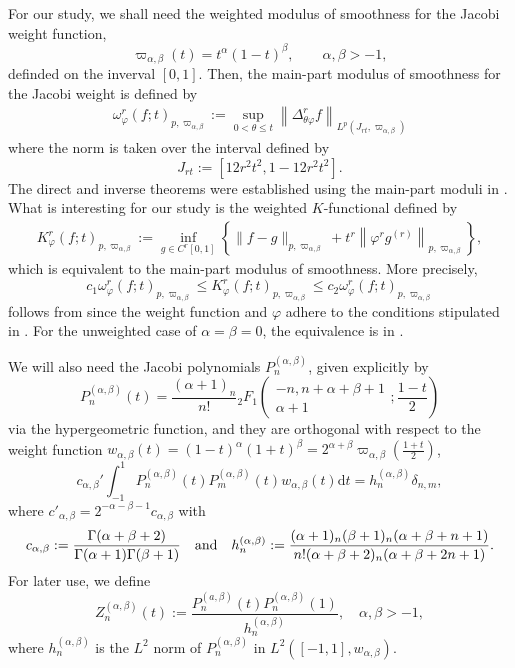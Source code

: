 \documentclass{amsart}
\theoremstyle{remark}
\def\d{\mathrm{d}}
\def\a{{\alpha}}
\def\b{{\beta}}
\def\t{{\theta}}
\def\o{{\omega}}
\def\d{\mathrm{d}}
\def\sK{{\mathsf K}}
\def\a{{\alpha}}
\def\b{{\beta}}
\def\t{{\theta}}
\def\o{{\omega}}
\begin{document}
For our study, we shall need the weighted  modulus of smoothness for the Jacobi weight function, 
$$
    \varpi_{\a,\b}(t) = t^\a (1-t)^\b, \qquad \a, \b > -1,
$$
definded on the inverval $[0,1]$. 
Then, the main-part  modulus of smoothness for the Jacobi weight is defined by \cite[(8.1.2)]{DT}
\begin{align} \label{eq:o_phi}
\o^r_\varphi (f; t)_{p,\varpi_{\a,\b}} := \sup_{0<\t \le t} \left\| \Delta_{\t\varphi}^r f\right\|_{L^p(J_{r t},\varpi_{\a,\b}) } 
\end{align} 
where the  norm is  taken over the interval defined by 
$$
J_ {r t}:=[12 r^2 t^2, 1- 12 r^2 t^2].
$$
The direct and inverse theorems were established using the main-part moduli in 
\cite[Theorem 8.2.1]{DT}. What is interesting for our study is the weighted $K$-functional defined by
\begin{align} \label{eq:K_phi}
   K^r_\varphi (f; t)_{p,\varpi_{\a,\b}} := \inf_{g \in C^r[0,1]}
  	\left \{ \|f-g\|_{p,\varpi_{\a,\b}} + t^r \left\|\varphi^r g^{(r)} \right\|_{p,\varpi_{\a,\b}} \right \},
\end{align}
which is equivalent to the main-part modulus of smoothness. More precisely, 
\begin{equation} \label{eq:K-o[0,1]}
   c_1 \o^r_\varphi (f; t)_{p,\varpi_{\a,\b}} \le K^r_\varphi (f; t)_{p,\varpi_{\a,\b}} \le c_2 \o^r_\varphi (f; t)_{p,\varpi_{\a,\b}}
\end{equation}
follows from \cite[Theorem 6.1.1]{DT} since the weight function and \(\varphi\) adhere to the conditions stipulated 
in \cite[(6.1.2) and Section 1.2]{DT}. For the unweighted case of $\a=\b=0$, the equivalence is in 
\cite[Theorem 2.1]{DT}. 

We will also need the Jacobi polynomials $P_n^{(\a,\b)}$, given explicitly by 
$$
  P_n^{(\a,\b)}(t) = \frac{(\a+1)_n}{n!} {}_2F_1 \left (\begin{matrix} -n, n+\a+\b+1 \\
      \a+1 \end{matrix}; \frac{1-t}{2} \right)
$$
via the hypergeometric function, and they are orthogonal with respect to the weight function 
$w_{\a,\b}(t)= (1-t)^\a(1+t)^\b = 2^{\a+\b}\varpi_{\a,\b}(\frac{1+t}{2})$,  
$$
  c_{\a,\b}' \int_{-1}^1 P_n^{(\a,\b)}(t) P_m^{(\a,\b)}(t) w_{\a,\b}(t) \d t = h_n^{(\a,\b)} \delta_{n,m},
$$
where  $c'_{\a,\b} = 2^{-\a-\b-1} c_{\a,\b}$ with 
\begin{align} \label{eq:JacobiNorm}
  c_{\a,\b} := \frac{\Gamma(\a+\b+2)}{\Gamma(\a+1)\Gamma(\b+1)}\quad\hbox{and}\quad  h_n^{(\a,\b)}:= \frac{(\a+1)_n (\b+1)_n(\a+\b+n+1)}{n!(\a+\b+2)_n(\a+\b+2 n+1)}.
\end{align}
For later use, we define 
\begin{equation}\label{eq:Zn} 
  Z_{n}^{(\a,\b)}(t) := \frac{P_n^{(a,\b)}(t) P_n^{(\a,\b)}(1)}{h_n^{(\a,\b)}},  \quad \a,\b > -1,
\end{equation}
where $h_n^{(\a,\b)}$ is the $L^2$ norm of $P_n^{(\a,\b)}$ in $L^2([-1,1],w_{\a,\b})$. 
\end{document}
